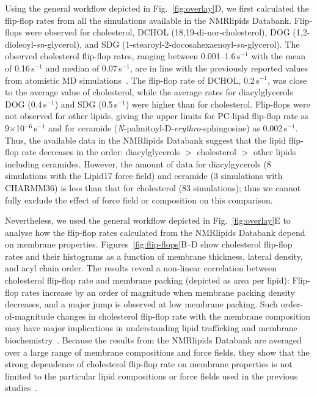 \documentclass[fleqn,10pt]{wlscirep}
\begin{document}
Using the general workflow depicted in Fig.~\ref{fig:overlay}D, we first calculated the flip-flop rates from all the simulations available in the NMRlipids Databank. Flip-flops were observed for cholesterol, %
DCHOL (18,19-di-nor-cholesterol), %
DOG (1,2-dioleoyl-\textit{sn}-glycerol), %
and SDG (1-stearoyl-2-docosahexaenoyl-\textit{sn}-glycerol).
The observed cholesterol flip-flop rates, ranging between 0.001--1.6\,\textmu{}s$^{-1}$ with the mean of 0.16\,\textmu{}s$^{-1}$ and median of 0.07\,\textmu{}s$^{-1}$, are in line with the previously reported values from atomistic MD simulations~\cite{gu19,javanainen19,baral20}.
The flip-flop rate of DCHOL, 0.2\,\textmu{}s$^{-1}$, was close to the average value of cholesterol, while
the average rates for diacylglycerols DOG (0.4\,\textmu{}s$^{-1}$) and SDG (0.5\,\textmu{}s$^{-1}$) were higher than for cholesterol.
Flip-flops were not observed for other lipids, giving the upper limits for
PC-lipid flip-flop rate as 9$\times$10$^{-6}$\,\textmu{}s$^{-1}$ and for
ceramide (\textit{N}-palmitoyl-\textsc{D}-\textit{erythro}-sphingosine) as 0.002\,\textmu{}s$^{-1}$.
Thus, the available data in the NMRlipids Databank suggest that the lipid flip-flop rate decreases in the order: diacylglycerols $>$ cholesterol $>$ other lipids including ceramides.
However, the amount of data for diacylgycerols (8 simulations with the Lipid17 force field) and ceramide (3 simulations with CHARMM36) is less than that for cholesterol (83 simulations); thus we cannot fully exclude the effect of force field or composition on this comparison.

Nevertheless, we used the general workflow depicted in Fig.~\ref{fig:overlay}E to analyse how the flip-flop rates calculated from the NMRlipids Databank depend on membrane properties. Figures~\ref{fig:flip-flops}B--D show cholesterol flip-flop rates and their histograms as a function of membrane thickness, lateral density, and acyl chain order. The results reveal a non-linear correlation between cholesterol flip-flop rate and membrane packing (depicted as area per lipid): Flip-flop rates increase by an order of magnitude when membrane packing density decreases, and a major jump is observed at low membrane packing. 
Such order-of-magnitude changes in cholesterol flip-flop rate with the membrane composition may have major implications in understanding lipid trafficking and membrane biochemistry~\cite{gu19,baral20}.
Because the results from the NMRlipids Databank are averaged over a large range of membrane compositions and force fields, they show that the strong dependence of cholesterol flip-flop rate on membrane properties is not limited to the particular lipid compositions or force fields used in the previous studies~\cite{gu19,javanainen19,baral20}.
\end{document}
